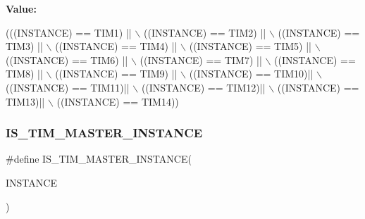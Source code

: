 {\bfseries Value\+:}
\begin{DoxyCode}
(((INSTANCE) == TIM1)  || \(\backslash\)
                                    ((INSTANCE) == TIM2) || \(\backslash\)
                                    ((INSTANCE) == TIM3) || \(\backslash\)
                                    ((INSTANCE) == TIM4) || \(\backslash\)
                                    ((INSTANCE) == TIM5) || \(\backslash\)
                                    ((INSTANCE) == TIM6) || \(\backslash\)
                                    ((INSTANCE) == TIM7) || \(\backslash\)
                                    ((INSTANCE) == TIM8) || \(\backslash\)
                                    ((INSTANCE) == TIM9) || \(\backslash\)
                                    ((INSTANCE) == TIM10)|| \(\backslash\)
                                    ((INSTANCE) == TIM11)|| \(\backslash\)
                                    ((INSTANCE) == TIM12)|| \(\backslash\)
                                    ((INSTANCE) == TIM13)|| \(\backslash\)
                                    ((INSTANCE) == TIM14))
\end{DoxyCode}
\mbox{\label{group___exported__macros_ga98104b1522d066b0c20205ca179d0eba}} 
\subsubsection{\texorpdfstring{I\+S\+\_\+\+T\+I\+M\+\_\+\+M\+A\+S\+T\+E\+R\+\_\+\+I\+N\+S\+T\+A\+N\+CE}{IS\_TIM\_MASTER\_INSTANCE}}
{\footnotesize\ttfamily \#define I\+S\+\_\+\+T\+I\+M\+\_\+\+M\+A\+S\+T\+E\+R\+\_\+\+I\+N\+S\+T\+A\+N\+CE(\begin{DoxyParamCaption}\item[{}]{I\+N\+S\+T\+A\+N\+CE }\end{DoxyParamCaption})}

